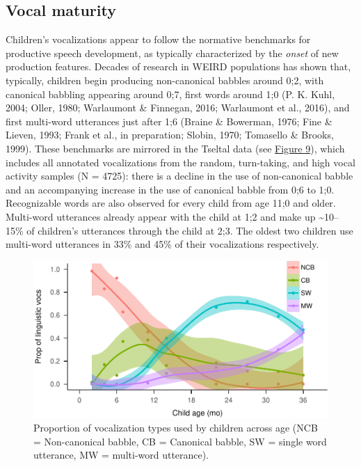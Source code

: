 \documentclass[floatsintext,man]{apa6}
\theoremstyle{definition}
\theoremstyle{definition}
\theoremstyle{definition}
\theoremstyle{remark}
\begin{document}
\subsection{Vocal maturity}\label{vocal-maturity}

Children's vocalizations appear to follow the normative benchmarks for
productive speech development, as typically characterized by the
\emph{onset} of new production features. Decades of research in WEIRD
populations has shown that, typically, children begin producing
non-canonical babbles around 0;2, with canonical babbling appearing
around 0;7, first words around 1;0 (P. K. Kuhl, 2004; Oller, 1980;
Warlaumont \& Finnegan, 2016; Warlaumont et al., 2016), and first
multi-word utterances just after 1;6 (Braine \& Bowerman, 1976; Fine \&
Lieven, 1993; Frank et al., in preparation; Slobin, 1970; Tomasello \&
Brooks, 1999). These benchmarks are mirrored in the Tseltal data (see
\protect\hyperlink{fig9}{Figure 9}), which includes all annotated
vocalizations from the random, turn-taking, and high vocal activity
samples (N = 4725): there is a decline in the use of non-canonical
babble and an accompanying increase in the use of canonical babble from
0;6 to 1;0. Recognizable words are also observed for every child from
age 11;0 and older. Multi-word utterances already appear with the child
at 1;2 and make up \textasciitilde{}10--15\% of children's utterances
through the child at 2;3. The oldest two children use multi-word
utterances in 33\% and 45\% of their vocalizations respectively.

\begin{figure}
\centering
\includegraphics{Tseltal-CLE_files/figure-latex/fig9-1.pdf}
\caption{\label{fig:fig9}Proportion of vocalization types used by children
across age (NCB = Non-canonical babble, CB = Canonical babble, SW =
single word utterance, MW = multi-word utterance).}
\end{figure}
\end{document}
